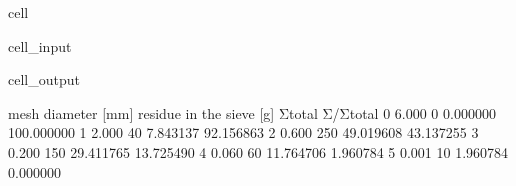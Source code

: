 \documentclass[letterpaper,10pt,english]{jupyterBook}
\begin{document}
\begin{sphinxuseclass}{cell}
\begin{sphinxVerbatimInput}
\begin{sphinxuseclass}{cell_input}
\end{sphinxuseclass}\end{sphinxVerbatimInput}
\begin{sphinxVerbatimOutput}

\begin{sphinxuseclass}{cell_output}
\begin{sphinxVerbatim}[commandchars=\\\{\}]
   mesh diameter [mm]  residue in the sieve [g]     Σtotal    Σ/Σtotal
0               6.000                         0   0.000000  100.000000
1               2.000                        40   7.843137   92.156863
2               0.600                       250  49.019608   43.137255
3               0.200                       150  29.411765   13.725490
4               0.060                        60  11.764706    1.960784
5               0.001                        10   1.960784    0.000000
\end{sphinxVerbatim}

\end{sphinxuseclass}\end{sphinxVerbatimOutput}

\end{sphinxuseclass}
\end{document}

